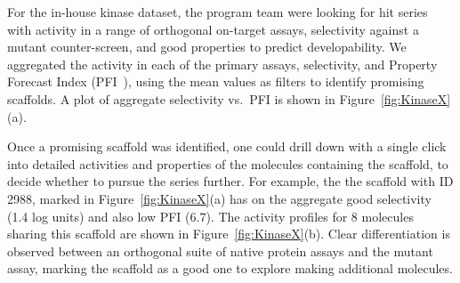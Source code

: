 \documentclass[journal=jacsat,manuscript=article]{achemso}
\newcommand*\fref[1]{Figure~\ref{fig:#1}}
\newcommand*\vs{vs.~}
\begin{document}
For the in-house kinase dataset, the program team were looking for hit series with activity in a range of orthogonal on-target assays, selectivity against a mutant counter-screen, and good properties to predict developability.  We aggregated the activity in each of the primary assays, selectivity, and Property Forecast Index (PFI~\cite{Young2011}), using the mean values as filters to identify promising scaffolds.  A plot of aggregate selectivity \vs PFI is shown in \fref{KinaseX}(a).

Once a promising scaffold was identified, one could drill down with a single click into detailed activities and properties of the molecules containing the scaffold, to decide whether to pursue the series further. For example, the
the scaffold with ID 2988, marked in \fref{KinaseX}(a) has on the aggregate good selectivity (1.4 log units) and also low PFI (6.7). The activity profiles for 8
molecules sharing this scaffold are shown in \fref{KinaseX}(b). Clear differentiation is observed between an orthogonal suite of native protein assays and the mutant assay, marking the scaffold as a good one to explore making additional molecules.
\end{document}
